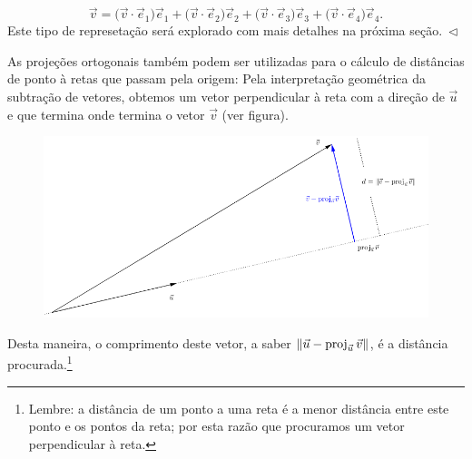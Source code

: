 \begin{ex}
	\begin{equation}
	\vec{v} = \big( \vec{v} \cdot \vec{e}_1 \big) \vec{e}_1 + \big( \vec{v} \cdot \vec{e}_2 \big) \vec{e}_2  + \big( \vec{v} \cdot \vec{e}_3 \big) \vec{e}_3  + \big( \vec{v} \cdot \vec{e}_4 \big) \vec{e}_4.
	\end{equation} Este tipo de represetação será explorado com mais detalhes na próxima seção$. \ \lhd$
\end{ex}

As projeções ortogonais também podem ser utilizadas para o cálculo de distâncias de ponto à retas que passam pela origem: Pela interpretação geométrica da subtração de vetores, obtemos um vetor perpendicular à reta com a direção de $\vec{u}$ e que termina onde termina o vetor $\vec{v}$ (ver figura).
\begin{figure}[h!]
	\begin{center}
		\includegraphics[width=1\linewidth]{Semana11/semana11-dist}
	\end{center}
\end{figure}

\noindent Desta maneira, o comprimento deste vetor, a saber $\|\vec{u} - \operatorname{proj}_{\vec{u}} \vec{v}\|$, é a distância procurada.\footnote{Lembre: a distância de um ponto a uma reta é a menor distância entre este ponto e os pontos da reta; por esta razão que procuramos um vetor perpendicular à reta.}

